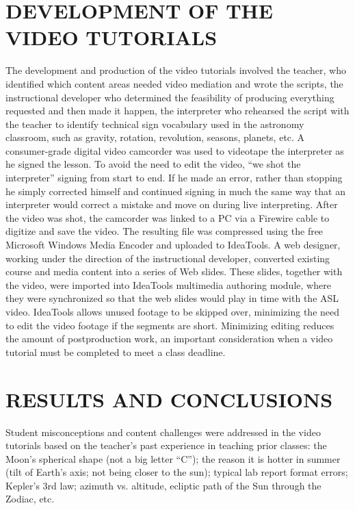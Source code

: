 \documentclass[11.5pt]{sig-alternate} %
\begin{document}
\begin{large}
\section*{DEVELOPMENT OF THE VIDEO TUTORIALS }
 
The development and production of the video tutorials involved the teacher, who identified which content areas needed video mediation and wrote the scripts, the instructional developer who determined the feasibility of producing everything requested and then made it happen, the interpreter who rehearsed the script with the teacher to identify technical sign vocabulary used in the astronomy classroom, such as gravity, rotation, revolution, seasons, planets, etc.  A consumer-grade digital video camcorder was used to videotape the interpreter as he signed the lesson.  To avoid the need to edit the video, “we shot the interpreter” signing from start to end.  If he made an error, rather than stopping he simply corrected himself and continued signing in much the same way that an interpreter would correct a mistake and move on during live interpreting.  After the video was shot, the camcorder was linked to a PC via a Firewire cable to digitize and save the video.  The resulting file was compressed using the free Microsoft Windows Media Encoder and uploaded to IdeaTools.  A web designer, working under the direction of the instructional developer, converted existing course and media content into a series of Web slides.  These slides, together with the video, were imported into IdeaTools multimedia authoring module, where they were synchronized so that the web slides would play in time with the ASL video.  IdeaTools allows unused footage to be skipped over, minimizing the need to edit the video footage if the segments are short.  Minimizing editing reduces the amount of postproduction work, an important consideration when a video tutorial must be completed to meet a class deadline. 
 
\section*{RESULTS AND CONCLUSIONS }
 
Student misconceptions and content challenges were addressed in the video tutorials based on the teacher’s past experience in teaching prior classes:  the Moon’s spherical shape (not a big letter “C”); the reason it is hotter in summer (tilt of Earth’s axis; not being closer to the sun); typical lab report format errors; Kepler’s 3rd law; azimuth vs. altitude, ecliptic path of the Sun through the Zodiac, etc. 
 

\end{large}
\end{document}
